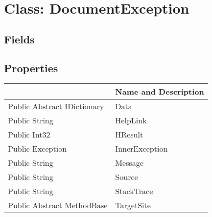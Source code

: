 \documentclass[11pt, oneside, a4paper]{book}
\begin{document}
\hypertarget{SoftwareEngineeringTools.{}Documentation.{}DocumentException}{}
\section{Class: DocumentException}

\subsection{Fields}

\subsection{Properties}
\begin{center}
\begin{tabular}{| p{3cm} | p{12cm} | }
\hline
\textbf{ } & \textbf{ Name and Description}\\
\hline
 Public  Abstract  IDictionary &  Data\hypertarget{SoftwareEngineeringTools.{}Documentation.{}DocumentException.{}Data}{}\\
\hline
 Public  String &  HelpLink\hypertarget{SoftwareEngineeringTools.{}Documentation.{}DocumentException.{}HelpLink}{}\\
\hline
 Public  Int32 &  HResult\hypertarget{SoftwareEngineeringTools.{}Documentation.{}DocumentException.{}HResult}{}\\
\hline
 Public  Exception &  InnerException\hypertarget{SoftwareEngineeringTools.{}Documentation.{}DocumentException.{}InnerException}{}\\
\hline
 Public  String &  Message\hypertarget{SoftwareEngineeringTools.{}Documentation.{}DocumentException.{}Message}{}\\
\hline
 Public  String &  Source\hypertarget{SoftwareEngineeringTools.{}Documentation.{}DocumentException.{}Source}{}\\
\hline
 Public  String &  StackTrace\hypertarget{SoftwareEngineeringTools.{}Documentation.{}DocumentException.{}StackTrace}{}\\
\hline
 Public  Abstract  MethodBase &  TargetSite\hypertarget{SoftwareEngineeringTools.{}Documentation.{}DocumentException.{}TargetSite}{}\\
\hline
\end{tabular}
\end{center}
\end{document}
